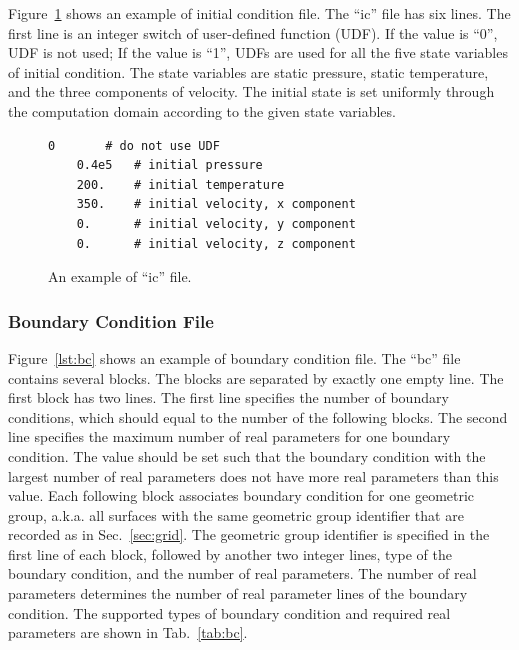 \documentclass[]{article}
\begin{document}
Figure~\ref{lst:ic} shows an example of initial condition file.
The ``ic'' file has six lines.
The first line is an integer switch of user-defined function (UDF).
If the value is ``0'', UDF is not used;
If the value is ``1'', UDFs are used for all the five state variables of initial condition.
The state variables are static pressure, static temperature, and the three components of velocity.
The initial state is set uniformly through the computation domain according to the given state
variables.

\begin{figure}[h!]
  \begin{lstlisting}[backgroundcolor=\color{lightgray}]
    0		# do not use UDF
    0.4e5	# initial pressure
    200.	# initial temperature
    350.	# initial velocity, x component
    0.		# initial velocity, y component
    0.		# initial velocity, z component
  \end{lstlisting}
  \caption{An example of ``ic'' file.}
  \label{lst:ic}
\end{figure}

\subsubsection{Boundary Condition File}

Figure~\ref{lst:bc} shows an example of boundary condition file.
The ``bc'' file contains several blocks.
The blocks are separated by exactly one empty line.
The first block has two lines.
The first line specifies the number of boundary conditions, which should equal to the number of the
following blocks.
The second line specifies the maximum number of real parameters for one boundary condition.
The value should be set such that the boundary condition with the largest number of real parameters
does not have more real parameters than this value.
Each following block associates boundary condition for one geometric group, a.k.a. all surfaces with
the same geometric group identifier that are recorded as in Sec.~\ref{sec:grid}.
The geometric group identifier is specified in the first line of each block, followed by another two
integer lines, type of the boundary condition, and the number of real parameters.
The number of real parameters determines the number of real parameter lines of the boundary
condition.
The supported types of boundary condition and required real parameters are shown in
Tab.~\ref{tab:bc}.
\end{document}
